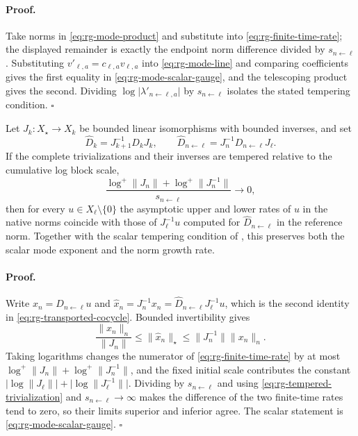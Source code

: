 \paragraph{Proof.}
Take norms in \eqref{eq:rg-mode-product} and substitute into
\eqref{eq:rg-finite-time-rate}; the displayed remainder is exactly the endpoint
norm difference divided by \(s_{n\leftarrow\ell}\). Substituting
\(v'_{\ell,a}=c_{\ell,a}v_{\ell,a}\) into \eqref{eq:rg-mode-line} and comparing
coefficients gives the first equality in \eqref{eq:rg-mode-scalar-gauge}, and
the telescoping product gives the second. Dividing
\(\log\lvert\lambda'_{n\leftarrow\ell,a}\rvert\) by \(s_{n\leftarrow\ell}\)
isolates the stated tempering condition. \(\square\)

Let \(J_k:X_\star\to X_k\) be bounded linear isomorphisms with bounded inverses,
and set
\begin{equation}
\widehat D_k=J_{k+1}^{-1}D_kJ_k,
\qquad
\widehat D_{n\leftarrow\ell}=J_n^{-1}D_{n\leftarrow\ell}J_\ell.
\label{eq:rg-transported-cocycle}
\end{equation}
If the complete trivializations and their inverses are tempered relative to the
cumulative log block scale,
\begin{equation}
\frac{\log^+\lVert J_n\rVert+\log^+\lVert J_n^{-1}\rVert}{s_{n\leftarrow\ell}}
\longrightarrow0,
\label{eq:rg-tempered-trivialization}
\end{equation}
then for every \(u\in X_\ell\setminus\{0\}\) the asymptotic upper and lower
rates of \(u\) in the native norms coincide with those of \(J_\ell^{-1}u\)
computed for \(\widehat D_{n\leftarrow\ell}\) in the reference norm. Together
with the scalar tempering condition of
, this preserves both the scalar mode
exponent and the norm growth rate. 

\paragraph{Proof.}
Write \(x_n=D_{n\leftarrow\ell}u\) and
\(\widehat x_n=J_n^{-1}x_n=\widehat D_{n\leftarrow\ell}J_\ell^{-1}u\), which is
the second identity in \eqref{eq:rg-transported-cocycle}. Bounded invertibility
gives
\begin{equation}
\frac{\lVert x_n\rVert_n}{\lVert J_n\rVert}
\leq\lVert\widehat x_n\rVert_\star
\leq\lVert J_n^{-1}\rVert\lVert x_n\rVert_n.
\label{eq:rg-trivialization-two-sided}
\end{equation}
Taking logarithms changes the numerator of \eqref{eq:rg-finite-time-rate} by at
most \(\log^+\lVert J_n\rVert+\log^+\lVert J_n^{-1}\rVert\), and the fixed
initial scale contributes the constant
\(\lvert\log\lVert J_\ell\rVert\rvert+\lvert\log\lVert J_\ell^{-1}\rVert\rvert\).
Dividing by \(s_{n\leftarrow\ell}\) and using
\eqref{eq:rg-tempered-trivialization} and \(s_{n\leftarrow\ell}\to\infty\)
makes the difference of the two finite-time rates tend to zero, so their limits
superior and inferior agree. The scalar statement is
\eqref{eq:rg-mode-scalar-gauge}. \(\square\)

